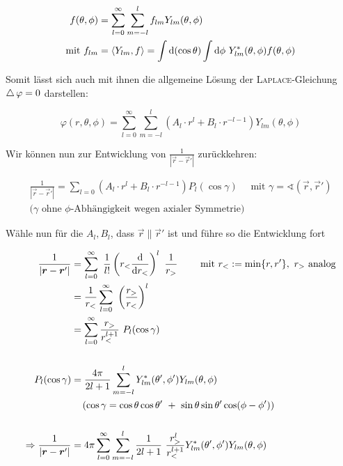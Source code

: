 \begin{align*}
f(\theta,\phi) &= \sum_{l=0}^{\infty} \sum_{m=-l}^{l} f_{lm} Y_{lm}(\theta,\phi)\\
\text{mit } f_{lm} &= \langle Y_{lm},f\rangle = \int\mathrm{d}(\cos\theta) \int\mathrm{d}\phi \ Y^{*}_{lm}(\theta,\phi)f(\theta,\phi)
\end{align*}

Somit lässt sich auch mit ihnen die allgemeine Lösung der \textsc{Laplace}-Gleichung $\mathop{{}\bigtriangleup}\nolimits\varphi=0$ darstellen: 

\begin{equation*}
\varphi(r,\theta,\phi) = \sum_{l=0}^{\infty}\sum_{m=-l}^{l} \left(A_l \cdot r^l + B_l \cdot r^{-l-1}\right) Y_{lm}(\theta,\phi)
\end{equation*}

Wir können nun zur Entwicklung von $\frac{1}{|\vec{r} - \vec{r}'|}$ zurückkehren:

\begin{align*}
\frac{1}{|\vec{r} - \vec{r}'|} = \sum_{l=0} \left(A_l \cdot r^l + B_l \cdot r^{-l-1}\right) P_l(\cos\gamma) \quad \text{ mit } \gamma = \sphericalangle\left(\vec{r},\vec{r}'\right)\\
(\gamma\text{ ohne $\phi$-Abhängigkeit wegen axialer Symmetrie)}
\end{align*}

Wähle nun für die $A_l, B_l$, dass $\vec{r}\parallel\vec{r}'$ ist und führe so die Entwicklung fort

\begin{align*}
\frac{1}{|\vec{r}-\vec{r}'|} &= \sum_{l=0}^{\infty} \ \frac{1}{l!} \left(\-r_{<}\diff{}{r_{<}}\right)^l \ \frac{1}{r_{>}} \qquad \text{ mit } r_{<} := \min\{r,r'\}, \ r_{>} \text{ analog}\\
&= \frac{1}{r_{<}}\sum_{l=0}^{\infty} \ \left(\frac{r_{>}}{r_{<}}\right)^l\\
&=  \sum_{l=0}^{\infty} \frac{r_{>}}{r_{<}^{l+1}} \ P_l (\cos\gamma)\\
\\
P_l (\cos\gamma) &= \frac{4\pi}{2l+1}\sum_{m=-l}^{l}  Y^{*}_{lm}(\theta',\phi')Y_{lm}(\theta,\phi)\\
& \quad\left(\cos\gamma = \cos\theta\cos\theta' \ + \ \sin\theta\sin\theta'\cos(\phi-\phi')\right)\\
\\
\Rightarrow \frac{1}{|\vec{r}-\vec{r}'|} &= 4\pi \sum_{l=0}^{\infty}\sum_{m=-l}^{l} \frac{1}{2l+1}\ \frac{r_{>}^l}{r_{<}^{l+1}} Y^{*}_{lm}(\theta',\phi')Y_{lm}(\theta,\phi)
\end{align*}


